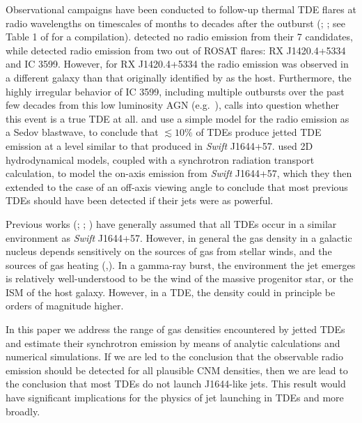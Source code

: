\documentclass[usenatbib,fleqn]{mnras}
\begin{document}
Observational campaigns have been conducted to follow-up thermal TDE
flares at radio wavelengths on timescales of months to decades after
the outburst (\citealt{Bower+2013}; \citealt{van-Velzen+2013}; see Table
1 of \citet{Mimica+2015} for a compilation).  \citet{van-Velzen+2013}
detected no radio emission from their 7 candidates, while
\citet{Bower+2013} detected radio emission from two out of ROSAT flares:
RX J1420.4+5334 and IC 3599.  However, for RX J1420.4+5334 the radio
emission was observed in a different galaxy than that originally
identified by \citet{Komossa+1999} as the host.  Furthermore, the
highly irregular behavior of IC 3599, including multiple outbursts
over the past few decades from this low luminosity AGN
(e.g.~\citealt{Campana+2015}), calls into question whether this event is
a true TDE at all.  \citet{Bower+2013} and \citet{van-Velzen+2013} use a
simple model for the radio emission as a Sedov blastwave, to conclude
that $\lesssim 10\%$ of TDEs produce jetted TDE emission at a level
similar to that produced in {\it Swift} J1644+57.  \citet{Mimica+2015}
used 2D hydrodynamical models, coupled with a synchrotron radiation
transport calculation, to model the on-axis emission from {\it Swift}
J1644+57, which they then extended to the case of an off-axis viewing
angle to conclude that most previous TDEs should have been detected if
their jets were as powerful.

Previous works (\citet{Bower+2013}; \citet{van-Velzen+2013};
\citealt{Mimica+2015}) have generally assumed that all TDEs occur in a
similar environment as {\it Swift} J1644+57.  However, in general the
gas density in a galactic nucleus depends sensitively on the sources
of gas from stellar winds, and the sources of gas heating
(\citealt{Quataert2004},\citealt{Generozov+2015}).  In a gamma-ray
burst, the environment the jet emerges is relatively well-understood
to be the wind of the massive progenitor star, or the ISM of the host
galaxy.  However, in a TDE, the density could in principle be orders
of magnitude higher.

In this paper we address the range of gas densities encountered by
jetted TDEs and estimate their synchrotron emission by means of
analytic calculations and numerical simulations.  If we are led to the
conclusion that the observable radio emission should be detected for
all plausible CNM densities, then we are lead to the conclusion that
most TDEs do not launch J1644-like jets.  This result would have
significant implications for the physics of jet launching in TDEs and
more broadly.
\end{document}

